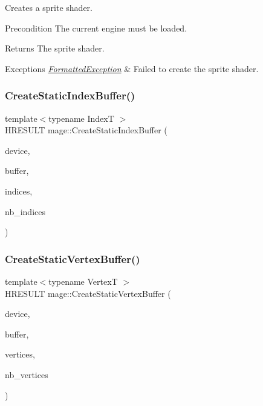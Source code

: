 Creates a sprite shader.

\begin{DoxyPrecond}{Precondition}
The current engine must be loaded. 
\end{DoxyPrecond}
\begin{DoxyReturn}{Returns}
The sprite shader. 
\end{DoxyReturn}

\begin{DoxyExceptions}{Exceptions}
{\em \hyperlink{structmage_1_1_formatted_exception}{Formatted\+Exception}} & Failed to create the sprite shader. \\
\hline
\end{DoxyExceptions}
\hypertarget{namespacemage_a6d7b762686800ea46b6f56dbfa0727a2}{}\label{namespacemage_a6d7b762686800ea46b6f56dbfa0727a2} 
\subsubsection{\texorpdfstring{Create\+Static\+Index\+Buffer()}{CreateStaticIndexBuffer()}}
{\footnotesize\ttfamily template$<$typename IndexT $>$ \\
H\+R\+E\+S\+U\+LT mage\+::\+Create\+Static\+Index\+Buffer (\begin{DoxyParamCaption}\item[{I\+D3\+D11\+Device2 $\ast$}]{device,  }\item[{I\+D3\+D11\+Buffer $\ast$$\ast$}]{buffer,  }\item[{const IndexT $\ast$}]{indices,  }\item[{size\+\_\+t}]{nb\+\_\+indices }\end{DoxyParamCaption})}

\hypertarget{namespacemage_a7cf0754e3bc2681bc1990e64f4155032}{}\label{namespacemage_a7cf0754e3bc2681bc1990e64f4155032} 
\subsubsection{\texorpdfstring{Create\+Static\+Vertex\+Buffer()}{CreateStaticVertexBuffer()}}
{\footnotesize\ttfamily template$<$typename VertexT $>$ \\
H\+R\+E\+S\+U\+LT mage\+::\+Create\+Static\+Vertex\+Buffer (\begin{DoxyParamCaption}\item[{I\+D3\+D11\+Device2 $\ast$}]{device,  }\item[{I\+D3\+D11\+Buffer $\ast$$\ast$}]{buffer,  }\item[{const VertexT $\ast$}]{vertices,  }\item[{size\+\_\+t}]{nb\+\_\+vertices }\end{DoxyParamCaption})}

